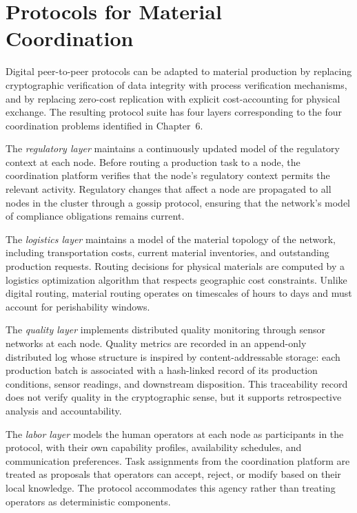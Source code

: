 \documentclass[12pt]{book}
\theoremstyle{definition}
\theoremstyle{remark}
\begin{document}
\section{Protocols for Material Coordination}

Digital peer-to-peer protocols can be adapted to material production
by replacing cryptographic verification of data integrity with
process verification mechanisms, and by replacing zero-cost
replication with explicit cost-accounting for physical exchange.
The resulting protocol suite has four layers corresponding to the
four coordination problems identified in Chapter~6.

The \emph{regulatory layer} maintains a continuously updated model
of the regulatory context at each node. Before routing a production
task to a node, the coordination platform verifies that the node's
regulatory context permits the relevant activity. Regulatory changes
that affect a node are propagated to all nodes in the cluster through
a gossip protocol, ensuring that the network's model of compliance
obligations remains current.

The \emph{logistics layer} maintains a model of the material topology
of the network, including transportation costs, current material
inventories, and outstanding production requests. Routing decisions
for physical materials are computed by a logistics optimization
algorithm that respects geographic cost constraints. Unlike digital
routing, material routing operates on timescales of hours to days
and must account for perishability windows.

The \emph{quality layer} implements distributed quality monitoring
through sensor networks at each node. Quality metrics are recorded
in an append-only distributed log whose structure is inspired by
content-addressable storage: each production batch is associated with
a hash-linked record of its production conditions, sensor readings,
and downstream disposition. This traceability record does not verify
quality in the cryptographic sense, but it supports retrospective
analysis and accountability.

The \emph{labor layer} models the human operators at each node as
participants in the protocol, with their own capability profiles,
availability schedules, and communication preferences. Task
assignments from the coordination platform are treated as proposals
that operators can accept, reject, or modify based on their local
knowledge. The protocol accommodates this agency rather than treating
operators as deterministic components.
\end{document}
